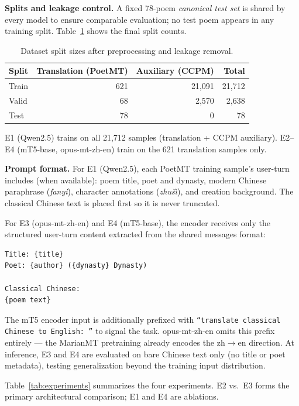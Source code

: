 \textbf{Splits and leakage control.} A fixed 78-poem \emph{canonical test set} is shared by every model to ensure comparable evaluation; no test poem appears in any training split. Table~\ref{tab:dataset} shows the final split counts.

\begin{table}[htbp]
\centering
\caption{Dataset split sizes after preprocessing and leakage removal.}
\label{tab:dataset}
\renewcommand{\arraystretch}{1.2}
\begin{tabular}{@{}lrrr@{}}
\toprule
\textbf{Split} & \textbf{Translation (PoetMT)} & \textbf{Auxiliary (CCPM)} & \textbf{Total} \\
\midrule
Train & 621 & 21{,}091 & 21{,}712 \\
Valid & 68  & 2{,}570  & 2{,}638  \\
Test  & 78  & 0        & 78       \\
\bottomrule
\end{tabular}
\end{table}

\noindent
E1 (Qwen2.5) trains on all 21{,}712 samples (translation + CCPM auxiliary). E2--E4 (mT5-base, opus-mt-zh-en) train on the 621 translation samples only.

\textbf{Prompt format.} For E1 (Qwen2.5), each PoetMT training sample's user-turn includes (when available): poem title, poet and dynasty, modern Chinese paraphrase (\textit{fanyi}), character annotations (\textit{zhu\v{s}\`{\i}}), and creation background. The classical Chinese text is placed first so it is never truncated.

For E3 (opus-mt-zh-en) and E4 (mT5-base), the encoder receives only the structured user-turn content extracted from the shared messages format:
\begin{verbatim}
Title: {title}
Poet: {author} ({dynasty} Dynasty)

Classical Chinese:
{poem text}
\end{verbatim}
The mT5 encoder input is additionally prefixed with \texttt{``translate classical Chinese to English: ''} to signal the task. opus-mt-zh-en omits this prefix entirely --- the MarianMT pretraining already encodes the zh$\to$en direction. At inference, E3 and E4 are evaluated on bare Chinese text only (no title or poet metadata), testing generalization beyond the training input distribution.

    Table~\ref{tab:experiments} summarizes the four experiments.
    E2 vs.\ E3 forms the primary architectural comparison; E1 and E4 are ablations.

